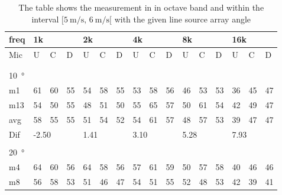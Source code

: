 \begin{table}[H]
\centering
\caption{The table shows the measurement in in octave band and within the interval $[\SI{5}{\meter\per\second},\, \SI{6}{\meter\per\second}[ $ with the given line source array angle}
\begin{tabular}{l|l|l|l|l|l|l|l|l|l|l|l|l|lll}
freq & \multicolumn{3}{l|}{1k} & \multicolumn{3}{l|}{2k} & \multicolumn{3}{l|}{4k} & \multicolumn{3}{l|}{8k} & \multicolumn{3}{l}{16k}                                \\ \hline
Mic  & U      & C      & D     & U      & C      & D     & U      & C      & D     & U      & C      & D     & \multicolumn{1}{l|}{U}  & \multicolumn{1}{l|}{C}  & D  \\ \hline
 & \multicolumn{3}{l|}{} & \multicolumn{3}{l|}{} & \multicolumn{3}{l|}{} & \multicolumn{3}{l|}{} & \multicolumn{3}{l}{}                                \\ 
 \multicolumn{16}{l}{ } \\                             
\SI{10}{\degree}   & \multicolumn{3}{l|}{} & \multicolumn{3}{l|}{} & \multicolumn{3}{l|}{} & \multicolumn{3}{l|}{} & \multicolumn{3}{l}{}   \\  \hline
m1   & 61     &  60    & 55    &  54    &   58   &  55   &  53    &  58    &   56  &  46    &  53    &  53   & \multicolumn{1}{l|}{36} & \multicolumn{1}{l|}{45} &  47\\ 
m13   &  54    &  50    & 55    & 48     &  51    &  50   &  55    &  65    & 57    & 50     &  61    &  54   & \multicolumn{1}{l|}{42} & \multicolumn{1}{l|}{49} &  47\\ \hline
avg & 58     & 55     & 55   &  51    & 54     &  52   &   54   & 61     &  57   &  48    &  57    & 53    & \multicolumn{1}{l|}{39} & \multicolumn{1}{l|}{47} & 47 \\ \hline 
Dif & \multicolumn{3}{l|}{-2.50} & \multicolumn{3}{l|}{1.41} & \multicolumn{3}{l|}{3.10} & \multicolumn{3}{l|}{5.28} & \multicolumn{3}{l}{7.93}      \\ 
 \multicolumn{16}{l}{ } \\                             
\SI{20}{\degree}   & \multicolumn{3}{l|}{} & \multicolumn{3}{l|}{} & \multicolumn{3}{l|}{} & \multicolumn{3}{l|}{} & \multicolumn{3}{l}{}   \\  \hline
m4    & 64     & 60     &  56    &   64   &  58    &  56    &   57   &   61    &  59    &  50     &   57   &  58    & \multicolumn{1}{l|}{40} & \multicolumn{1}{l|}{46} & 46 \\
m8    &  56    &  58   &   53   &   51   &   46   &  47    &   54   &   51    &   55   &    52   &    48  &   53   & \multicolumn{1}{l|}{42} & \multicolumn{1}{l|}{39} & 41 \\

\end{tabular}
\end{table}
